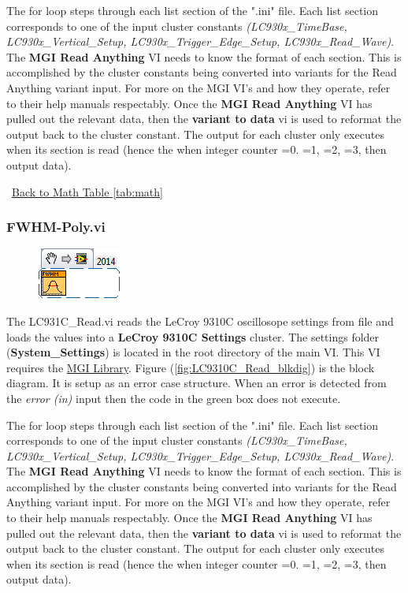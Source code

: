 \documentclass[11pt,a4paper,oldfontcommands]{memoir}
\begin{document}
The for loop steps through each list section of the ".ini" file. Each list section corresponds to one of the input cluster constants \textit{(LC930x\_TimeBase, LC930x\_Vertical\_Setup, LC930x\_Trigger\_Edge\_Setup, LC930x\_Read\_Wave)}. The \textbf{MGI Read Anything} VI needs to know the format of each section. This is accomplished by the cluster constants being converted into variants for the Read Anything variant input.  For more on the MGI VI's and how they operate, refer to their help manuals respectably. Once the \textbf{MGI Read Anything} VI has pulled out the relevant data, then the \textbf{variant to data} vi is used to reformat the output back to the cluster constant. The output for each cluster only executes when its section is read (hence the when integer counter =0. =1, =2, =3, then output data).

\noindent\hrulefill\, \hyperref[tab:math]{Back to Math Table \ref{tab:math}}

\subsubsection{FWHM-Poly.vi} \label{FWHM-Poly}
\noindent\hrulefill

\begin{figure}[h]
	\includegraphics[scale=0.625]{FWHM-Poly_main_01}
	\label{fig:FWHM-Poly_main_01}
\end{figure}

The LC931C\_Read.vi reads the LeCroy 9310C oscillosope settings from file and loads the values into a \textbf{LeCroy 9310C Settings} cluster. The settings folder (\textbf{System\_Settings}) is located in the root directory of the main VI. This VI requires the \href{http://sine.ni.com/nips/cds/view/p/lang/en/nid/209753}{MGI Library}. Figure (\ref{fig:LC9310C_Read_blkdig}) is the block diagram.  It is setup as an error case structure. When an error is detected from the \textit{error (in)} input then the code in the green box does not execute.

The for loop steps through each list section of the ".ini" file. Each list section corresponds to one of the input cluster constants \textit{(LC930x\_TimeBase, LC930x\_Vertical\_Setup, LC930x\_Trigger\_Edge\_Setup, LC930x\_Read\_Wave)}. The \textbf{MGI Read Anything} VI needs to know the format of each section. This is accomplished by the cluster constants being converted into variants for the Read Anything variant input.  For more on the MGI VI's and how they operate, refer to their help manuals respectably. Once the \textbf{MGI Read Anything} VI has pulled out the relevant data, then the \textbf{variant to data} vi is used to reformat the output back to the cluster constant. The output for each cluster only executes when its section is read (hence the when integer counter =0. =1, =2, =3, then output data).
\end{document}
